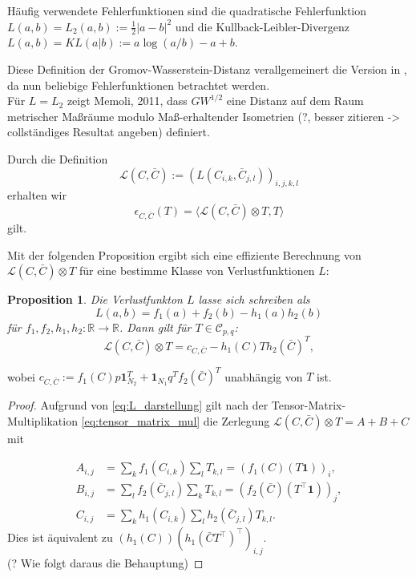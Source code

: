 \documentclass[twoside, 11pt,a4paper]{article}
\newtheorem{proposition}[theorem]{Proposition}
\numberwithin{equation}{section}
\begin{document}
	\noindent Häufig verwendete Fehlerfunktionen sind die quadratische Fehlerfunktion $L(a,b) = L_2(a,b) := \frac{1}{2}|a-b|^2$ und die Kullback-Leibler-Divergenz $L(a,b)  = KL(a|b) := a\log(a/b) -a+b$.
	
	Diese Definition der Gromov-Wasserstein-Distanz verallgemeinert die Version in \cite{gwd_averaging_kernels}, da nun beliebige Fehlerfunktionen betrachtet werden.\\
	
	Für $L=L_2 $ zeigt Memoli, 2011, dass $GW^{1/2}$ eine Distanz auf dem Raum metrischer Maßräume modulo Maß-erhaltender Isometrien (?, besser zitieren -> collständiges Resultat angeben) definiert.
	
	Durch die Definition 
	\begin{equation}
	\mathcal{L} (C, \bar{C}):= (L(C_{i,k}, \bar{C}_{j,l}))_{i,j,k,l}
	\end{equation}
	erhalten wir
	\begin{equation}
	\mathcal{\epsilon}_{C, \bar{C}}(T) = \langle \mathcal{L} (C, \bar{C}) \otimes T, T\rangle
	\end{equation}
	gilt.
	
	Mit der folgenden Proposition ergibt sich eine effiziente Berechnung von $\mathcal{L} (C, \bar{C}) \otimes T$ für eine bestimme Klasse von Verlustfunktionen $L$:
	
	\begin{proposition}\label{prop:loss_reformulated}
		Die Verlustfunkton $L$ lasse sich schreiben als 
		\begin{equation}
		L(a,b) = f_1(a) + f_2(b) - h_1(a)h_2(b) \label{eq:L_darstellung}
		\end{equation}
		für $f_1, f_2,h_1, h_2:\mathbb{R} \to \mathbb{R}$. Dann gilt für $T \in \mathcal{C}_{p,q}$:
		\begin{equation}
		\mathcal{L} (C, \bar{C}) \otimes T = c_{C, \bar{C}} - h_1(C)Th_2(\bar{C})^T,
		\end{equation}
	\end{proposition} 
	wobei $c_{C, \bar{C}}:= f_1(C)p \boldsymbol{1}_{N_2}^T + \boldsymbol{1}_{N_1}q^Tf_2(\bar{C})^T$ unabhängig von $T$ ist.
	
	\begin{proof}
		Aufgrund von \autoref{eq:L_darstellung} gilt nach der Tensor-Matrix-Multiplikation \autoref{eq:tensor_matrix_mul}
		die Zerlegung $\mathcal{L} (C, \bar{C}) \otimes T = A + B + C$ mit
		
		\begin{align*}
		A_{i,j} &= \sum_k{f_1(C_{i,k})} \sum_l{T_{k,l}} = (f_1(C)(T\boldsymbol{1}))_i, \\
		B_{i,j} &= \sum_l{f_2(\bar{C}_{j,l})} \sum_k{T_{k,l}} = (f_2(\bar{C})(T^\top\boldsymbol{1}))_j,\\
		C_{i,j} &= \sum_k{h_1(C_{i,k})} \sum_l{h_2(\bar{C}_{j,l})T_{k,l}}.
		\end{align*}
		Dies ist äquivalent zu $(h_1(C))(h_1(\bar{C}T^\top)^\top)_{i,j}.$\\
		(? Wie folgt daraus die Behauptung)
	\end{proof}
	
\end{document}
